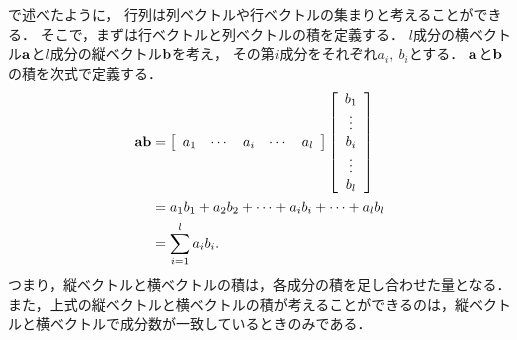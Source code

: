 \begin{itemize}
%
%
%
で述べたように，
行列は列ベクトルや行ベクトルの集まりと考えることができる．
そこで，まずは行ベクトルと列ベクトルの積を定義する．
%
$l$成分の横ベクトル${\bf a}$と$l$成分の縦ベクトル${\bf b}$を考え，
その第$i$成分をそれぞれ$a_{i},~b_{i}$とする．
%
${\bf a}$と${\bf b}$の積を次式で定義する．
%
\begin{align}
{\bf a}{\bf b} & =\left[\begin{array}{ccccc}
a_{1} & \cdots & a_{i} & \cdots & a_{l}\end{array}\right]\left[\begin{array}{c}
b_{1}\\
\vdots\\
b_{i}\\
\vdots\\
b_{l}
\end{array}\right]\notag\\
 & =a_{1}b_{1}+a_{2}b_{2}+\cdots+a_{i}b_{i}+\cdots+a_{l}b_{l}\notag\\
 & =\sum_{i=1}^{l} a_{i}b_{i}. 
\end{align}
%
つまり，縦ベクトルと横ベクトルの積は，各成分の積を足し合わせた量となる．
また，上式の縦ベクトルと横ベクトルの積が考えることができるのは，縦ベクトルと横ベクトルで成分数が一致しているときのみである．


\end{itemize}

